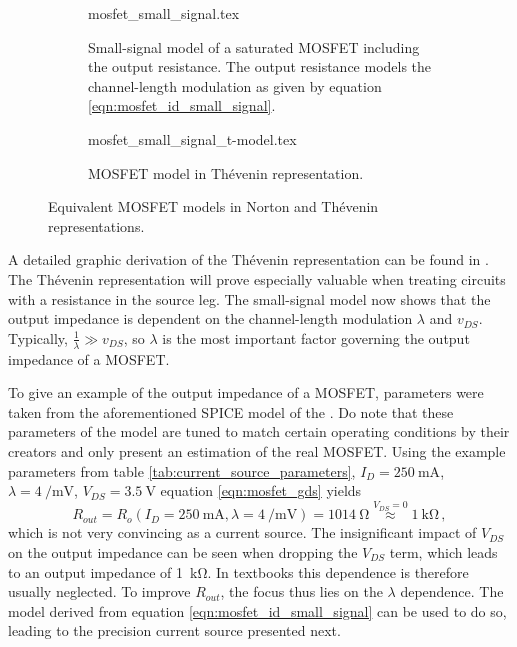 \begin{figure}[hb]
    \centering
    \begin{subfigure}{0.4\linewidth}
        \centering
        {mosfet_small_signal.tex}
        \caption{Small-signal model of a saturated MOSFET including the output resistance. The output resistance models the channel-length modulation as given by equation \ref{eqn:mosfet_id_small_signal}.}
        \label{fig:mostfet_small_signa_model_model_norton}
    \end{subfigure}
    \begin{subfigure}{0.4\linewidth}
        \centering
        {mosfet_small_signal_t-model.tex}
        \caption{MOSFET model in Thévenin representation.}
        \label{fig:mostfet_small_signa_model_thevenin}
    \end{subfigure}
    \caption{Equivalent MOSFET models in Norton and Thévenin representations.}
    \label{fig:mostfet_small_signa_model}
\end{figure}

A detailed graphic derivation of the Thévenin representation can be found in \cite{fet_equations}. The Thévenin representation will prove especially valuable when treating circuits with a resistance in the source leg.
The small-signal model now shows that the output impedance is dependent on the channel-length modulation $\lambda$ and $v_{DS}$. Typically, $\frac{1}{\lambda} \gg v_{DS}$, so $\lambda$ is the most important factor governing the output impedance of a MOSFET.

To give an example of the output impedance of a MOSFET, parameters were taken from the aforementioned SPICE model of the . Do note that these parameters of the model are tuned to match certain operating conditions by their creators and only present an estimation of the real MOSFET. Using the example parameters from table \ref{tab:current_source_parameters}, $I_D=\qty{250}{\mA}$, $\lambda = \qty[per-mode=power]{4}{\per \milli \volt}$, $V_{DS}=\qty{3.5}{\V}$ equation \ref{eqn:mosfet_gds} yields
\begin{equation}
    R_{out} = R_{o}\left(I_D=\qty{250}{\mA}, \lambda = \qty[per-mode=power]{4}{\per \milli \volt}\right) = \qty{1014}{\ohm} \overset{V_{DS} = 0}{\approx} \qty{1}{\kilo \ohm} \, , \label{eqn:mosfet_rout_irf9610}
\end{equation}
which is not very convincing as a current source. The insignificant impact of $V_{DS}$ on the output impedance can be seen when dropping the $V_{DS}$ term, which leads to an output impedance of \qty{1}{\kilo \ohm}. In textbooks this dependence is therefore usually neglected. To improve $R_{out}$, the focus thus lies on the $\lambda$ dependence. The model derived from equation \ref{eqn:mosfet_id_small_signal} can be used to do so, leading to the precision current source presented next.

